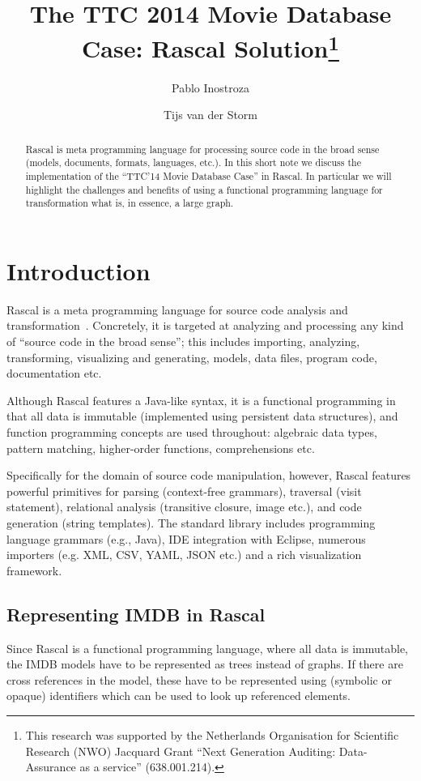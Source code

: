 \documentclass[submission,copyright,creativecommons]{eptcs}
\title{The TTC 2014 Movie Database Case: Rascal Solution\thanks{This
    research was supported by the Netherlands Organisation for
    Scientific Research (NWO) Jacquard Grant ``Next Generation
    Auditing: Data-Assurance as a service'' (638.001.214).}}
\author{Pablo Inostroza \and Tijs van der Storm}
\begin{document}
\maketitle

\begin{abstract}
Rascal is meta programming language for processing source code in the broad sense (models, documents, formats, languages, etc.). In this short note we discuss the implementation of the ``TTC'14 Movie Database Case'' in Rascal. In particular we will highlight the challenges and benefits of using a functional programming language for transformation what is, in essence, a large graph. 
\end{abstract}

\section{Introduction}

Rascal is a meta programming language for source code analysis and transformation~\cite{Rascal,RascalGTTSE}. 
Concretely, it is targeted at analyzing and processing any kind of ``source code in the broad sense''; this includes importing, analyzing, transforming, visualizing and generating, models, data files, program code, documentation etc.
 
Although Rascal features a Java-like syntax, it is a functional programming in that all data is immutable (implemented using persistent data structures), and function programming concepts are used throughout: algebraic data types, pattern matching, higher-order functions, comprehensions etc. 

Specifically for the domain of source code manipulation, however, Rascal features powerful primitives for parsing (context-free grammars), traversal (visit statement), relational analysis (transitive closure, image etc.), and code generation (string templates). 
The standard library includes programming language grammars (e.g., Java), IDE integration
with Eclipse, numerous importers (e.g. XML, CSV, YAML, JSON etc.) and a rich visualization framework. 

\subsection{Representing IMDB in Rascal}

Since Rascal is a functional programming language, where all data is immutable, the IMDB models have to be represented as trees instead of graphs. If there are cross references in the model, these have to be represented using (symbolic or opaque) identifiers which can be used to look up referenced elements. 
\end{document}
